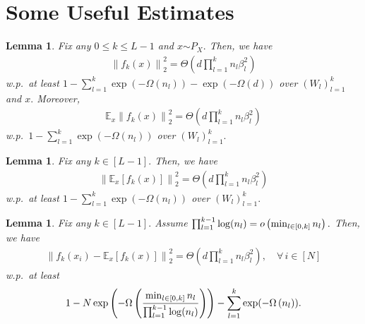 \documentclass[11pt]{article}
\newcommand{\E}{\mathbb{E}}
\newcommand{\distas}[1]{\mathbin{\overset{#1}{\sim}}}
\newtheorem{lemma}[theorem]{Lemma}
\newcommand{\littleO}[1]{o\left(#1\right)}
\newcommand{\bigO}[1]{\mathcal{O}\left(#1\right)}
\newcommand{\bigOmg}[1]{\Omega\left(#1\right)}
\newcommand{\bigTheta}[1]{\Theta\left(#1\right)}
\newcommand{\bigexp}[1]{\exp\left(#1\right)}
\newcommand{\norm}[1]{\left\|#1\right\|}
\newcommand{\svmax}[1]{\sigma_{\rm max}\left(#1\right)}
\def\min{\mathop{\rm min}\nolimits}
\def\max{\mathop{\rm max}\nolimits}
\begin{document}
\section{Some Useful Estimates}\label{app:more_results}
\begin{lemma}\label{lem:norm_feature_map}
    Fix any $0\leq k\leq L-1$ and $x\distas{}P_X.$
    Then, we have
    \begin{align*}
	    \norm{f_k(x)}_2^2 = \bigTheta{ d\prod_{l=1}^k n_l \beta_l^2 } 
    \end{align*}
    w.p.\ at least $1-\sum_{l=1}^{k} \bigexp{-\bigOmg{n_l}} - \exp(-\bigOmg{d})$ over $(W_l)_{l=1}^{k}$ and $x.$
    Moreover, 
    \begin{align*}
	\E_x \norm{f_k(x)}_2^2 = \bigTheta{ d\prod_{l=1}^k n_l \beta_l^2 }
    \end{align*}
    w.p.\ $1-\sum_{l=1}^{k} \bigexp{-\bigOmg{n_l}}$ over $(W_l)_{l=1}^{k}.$
\end{lemma}

\begin{lemma}\label{lem:norm_of_expected_feature_map}
    Fix any $k\in[L-1].$
    Then, we have
    \begin{align*}
	    \norm{\E_x[f_k(x)]}_2^2 = \bigTheta{ d\prod_{l=1}^{k} n_l \beta_l^2 } 
    \end{align*}
    w.p.\ at least $1 - \sum_{l=1}^k\bigexp{-\bigOmg{n_l}}$ over $(W_l)_{l=1}^k.$
\end{lemma}

\begin{lemma}\label{lem:square_fx}
    Fix any $k\in[L-1].$ 
    Assume $\prod_{l=1}^{k-1} \log(n_l)=\littleO{\min_{l\in[0,k]} n_l}.$ 
    Then, we have
    \begin{align}
	    \norm{f_{k}(x_i) - \E_{x}[f_{k}(x)]}_2^2 = \bigTheta{ d \prod_{l=1}^{k} n_l\beta_l^2} ,\quad\forall\,i\in[N] 
    \end{align}
    w.p.\ at least
    \begin{align*}
	1-N\bigexp{ -\bigOmg{ \frac{\min_{l\in[0,k]} n_l}{\prod_{l=1}^{k-1}\log(n_l)} } }
	  - \sum_{l=1}^{k}\exp(-\bigOmg{n_l}) .
    \end{align*}
\end{lemma}
\end{document}
